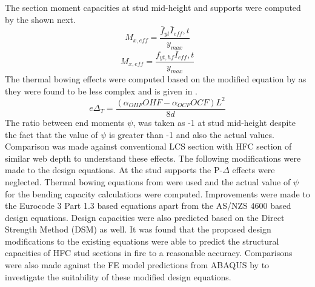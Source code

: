 The section moment capacities at stud mid-height and supports were computed by the  shown next.
\begin{equation}\label{eq:M_mid-height}
M_{x,eff} = \dfrac{\bar{f}_{yt}\bar{I}_{eff},t}{y_{max}}
\end{equation}
\begin{equation}\label{eq:M_support}
M_{x,eff} = \dfrac{f_{yt,hf}\bar{I}_{eff},t}{y_{max}}
\end{equation}
The thermal bowing effects were computed based on the modified equation by \citet{Baleshan2016a} as they were found to be less complex and is given in .
\begin{equation}\label{eq:bal_e-delta}
e\Delta_T = \dfrac{(\alpha_{OHF}OHF-\alpha_{OCF}OCF)L^2}{8d}
\end{equation}
The ratio between end moments $\psi$, was taken as -1 at stud mid-height despite the fact that the value of $\psi$ is greater than -1 and also the actual values. Comparison was made against conventional LCS section with HFC section of similar web depth to understand these effects. The following modifications were made to the design equations. At the stud supports the P-$\Delta$ effects were neglected. Thermal bowing equations from \citet{Baleshan2016a} were used and the actual value of $\psi$ for the bending capacity calculations were computed. Improvements were made to the Eurocode 3 Part 1.3 based equations apart from the AS/NZS 4600 based design equations. Design capacities were also predicted based on the Direct Strength Method (DSM) as well. It was found that the proposed design modifications to the existing equations were able to predict the structural capacities of HFC stud sections in fire to a reasonable accuracy. Comparisons were also made against the FE model predictions from ABAQUS by \citet{Kesawan2016a} to investigate the suitability of these modified design equations. 

